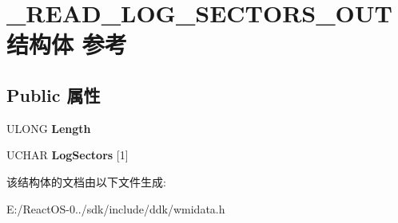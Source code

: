 \hypertarget{struct___r_e_a_d___l_o_g___s_e_c_t_o_r_s___o_u_t}{}\section{\+\_\+\+R\+E\+A\+D\+\_\+\+L\+O\+G\+\_\+\+S\+E\+C\+T\+O\+R\+S\+\_\+\+O\+U\+T结构体 参考}
\label{struct___r_e_a_d___l_o_g___s_e_c_t_o_r_s___o_u_t}
\subsection*{Public 属性}
\begin{DoxyCompactItemize}
\item 
\mbox{\label{struct___r_e_a_d___l_o_g___s_e_c_t_o_r_s___o_u_t_aa9b97d01fcdda0bb6ebccd238e4404d5}} 
U\+L\+O\+NG {\bfseries Length}
\item 
\mbox{\label{struct___r_e_a_d___l_o_g___s_e_c_t_o_r_s___o_u_t_af6e8ddce4b886c5a103910e9cd817a61}} 
U\+C\+H\+AR {\bfseries Log\+Sectors} \mbox{[}1\mbox{]}
\end{DoxyCompactItemize}


该结构体的文档由以下文件生成\+:\begin{DoxyCompactItemize}
\item 
E\+:/\+React\+O\+S-\/0../sdk/include/ddk/wmidata.\+h\end{DoxyCompactItemize}
